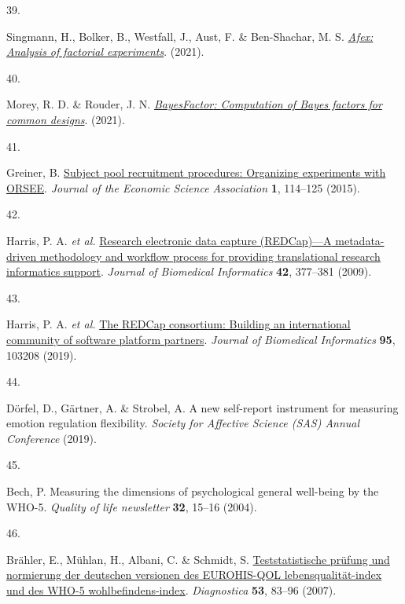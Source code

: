 \documentclass[
  man,floatsintext]{apa6}
\newlength{\cslhangindent}
\newlength{\csllabelwidth}
\newlength{\cslentryspacingunit} %
\newenvironment{CSLReferences}[2] %
 {%
  \setlength{\parindent}{0pt}
  \ifodd #1
  \let\oldpar\par
  \def\par{\hangindent=\cslhangindent\oldpar}
  \fi
  \setlength{\parskip}{#2\cslentryspacingunit}
 }%
 {}
\newcommand{\CSLLeftMargin}[1]{\parbox[t]{\csllabelwidth}{#1}}
\newcommand{\CSLRightInline}[1]{\parbox[t]{\linewidth - \csllabelwidth}{#1}\break}
\begin{document}
\begin{CSLReferences}{0}{0}
\leavevmode{}%
\CSLLeftMargin{39. }%
\CSLRightInline{Singmann, H., Bolker, B., Westfall, J., Aust, F. \& Ben-Shachar, M. S. \emph{\href{https://CRAN.R-project.org/package=afex}{Afex: {A}nalysis of factorial experiments}}. (2021).}

\leavevmode{}%
\CSLLeftMargin{40. }%
\CSLRightInline{Morey, R. D. \& Rouder, J. N. \emph{\href{https://CRAN.R-project.org/package=BayesFactor}{{BayesFactor}: {Computation} of {Bayes} factors for common designs}}. (2021).}

\leavevmode{}%
\CSLLeftMargin{41. }%
\CSLRightInline{Greiner, B. \href{https://doi.org/10.1007/s40881-015-0004-4}{Subject pool recruitment procedures: {Organizing} experiments with {ORSEE}}. \emph{Journal of the Economic Science Association} \textbf{1}, 114--125 (2015).}

\leavevmode{}%
\CSLLeftMargin{42. }%
\CSLRightInline{Harris, P. A. \emph{et al.} \href{https://doi.org/10.1016/j.jbi.2008.08.010}{Research electronic data capture ({REDCap})---{A} metadata-driven methodology and workflow process for providing translational research informatics support}. \emph{Journal of Biomedical Informatics} \textbf{42}, 377--381 (2009).}

\leavevmode{}%
\CSLLeftMargin{43. }%
\CSLRightInline{Harris, P. A. \emph{et al.} \href{https://doi.org/10.1016/j.jbi.2019.103208}{The {REDCap} consortium: {Building} an international community of software platform partners}. \emph{Journal of Biomedical Informatics} \textbf{95}, 103208 (2019).}

\leavevmode{}%
\CSLLeftMargin{44. }%
\CSLRightInline{Dörfel, D., Gärtner, A. \& Strobel, A. A new self-report instrument for measuring emotion regulation flexibility. \emph{Society for Affective Science (SAS) Annual Conference} (2019).}

\leavevmode{}%
\CSLLeftMargin{45. }%
\CSLRightInline{Bech, P. Measuring the dimensions of psychological general well-being by the WHO-5. \emph{Quality of life newsletter} \textbf{32}, 15--16 (2004).}

\leavevmode{}%
\CSLLeftMargin{46. }%
\CSLRightInline{Brähler, E., Mühlan, H., Albani, C. \& Schmidt, S. \href{https://doi.org/10.1026/0012-1924.53.2.83}{Teststatistische pr{ü}fung und normierung der deutschen versionen des EUROHIS-QOL lebensqualit{ä}t-index und des WHO-5 wohlbefindens-index}. \emph{Diagnostica} \textbf{53}, 83--96 (2007).}


\end{CSLReferences}
\end{document}
